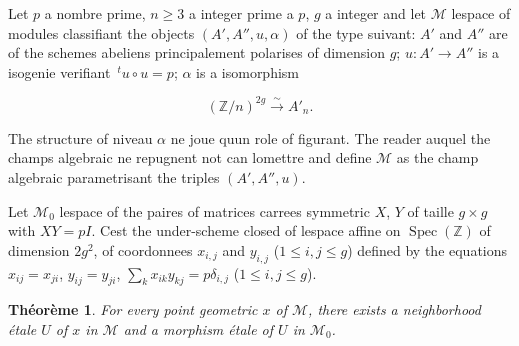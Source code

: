 \documentclass[11pt,a4paper]{article}
\theoremstyle{plain}
\newtheorem{theorem}{Th\'eor\`eme}
\theoremstyle{definition}
\DeclareMathOperator{\Spec}{Spec}
\begin{document}
Let $p$ a nombre prime, $n \geq 3$ a integer prime a $p$, $g$ a integer and let
$\mathscr{M}$ lespace of modules classifiant the objects $(A', A'', u, \alpha)$ of the type suivant: $A'$ and
$A''$ are of the schemes abeliens principalement polarises of dimension $g$;
$u: A' \to A''$ is a isogenie verifiant $\,\!^t u \circ u = p$; $\alpha$ is a isomorphism

\begin{equation}
(\mathbb{Z}/n)^{2g} \xrightarrow{\sim} A'_n.
\end{equation}

The structure of niveau $\alpha$ ne joue quun role of figurant. The reader auquel the
champs algebraic ne repugnent not can lomettre and define $\mathscr{M}$ as the
champ algebraic parametrisant the triples $(A', A'', u)$.

Let $\mathscr{M}_0$ lespace of the paires of matrices carrees symmetric $X$, $Y$ of taille
$g \times g$ with $XY = pI$. Cest the under-scheme closed of lespace affine on $\Spec(\mathbb{Z})$
of dimension $2g^2$, of coordonnees $x_{i,j}$ and $y_{i,j}$ ($1 \leq i, j \leq g$) defined by the
equations $x_{ij} = x_{ji}$, $y_{ij} = y_{ji}$, $\sum_k x_{ik}y_{kj} = p\delta_{i,j}$ ($1 \leq i, j \leq g$).

\begin{theorem}
For every point geometric $x$ of $\mathscr{M}$, there exists a neighborhood
étale $U$ of $x$ in $\mathscr{M}$ and a morphism étale of $U$ in $\mathscr{M}_0$.
\end{theorem}
\end{document}
